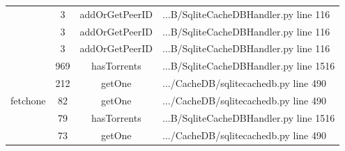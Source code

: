 \begin{table}[!h]
{\begin{tabular}{|c|c|c|l|}
		\multicolumn{1}{|c|}{} & \multicolumn{1}{c|}{3}  & \multicolumn{1}{c|}{addOrGetPeerID}  & \multicolumn{1}{l|}{...B/SqliteCacheDBHandler.py line 116}  \\ \cline{2-4} 
		\multicolumn{1}{|c|}{} & \multicolumn{1}{c|}{3}  & \multicolumn{1}{c|}{addOrGetPeerID}  & \multicolumn{1}{l|}{...B/SqliteCacheDBHandler.py line 116}  \\ \cline{2-4} 
		\multicolumn{1}{|c|}{} & \multicolumn{1}{c|}{3}  & \multicolumn{1}{c|}{addOrGetPeerID}  & \multicolumn{1}{l|}{...B/SqliteCacheDBHandler.py line 116}  \\ \hline 
		\multicolumn{1}{|c|}{\multirow{5}{*}{fetchone}} & \multicolumn{1}{c|}{969} & \multicolumn{1}{c|}{hasTorrents} & \multicolumn{1}{l|}{...B/SqliteCacheDBHandler.py line 1516} \\ \cline{2-4}
		\multicolumn{1}{|c|}{} & \multicolumn{1}{c|}{212}  & \multicolumn{1}{c|}{getOne}  & \multicolumn{1}{l|}{.../CacheDB/sqlitecachedb.py line 490}  \\ \cline{2-4} 
		\multicolumn{1}{|c|}{} & \multicolumn{1}{c|}{82}  & \multicolumn{1}{c|}{getOne}  & \multicolumn{1}{l|}{.../CacheDB/sqlitecachedb.py line 490}  \\ \cline{2-4} 
		\multicolumn{1}{|c|}{} & \multicolumn{1}{c|}{79}  & \multicolumn{1}{c|}{hasTorrents}  & \multicolumn{1}{l|}{...B/SqliteCacheDBHandler.py line 1516}  \\ \cline{2-4} 
		\multicolumn{1}{|c|}{} & \multicolumn{1}{c|}{73}  & \multicolumn{1}{c|}{getOne}  & \multicolumn{1}{l|}{.../CacheDB/sqlitecachedb.py line 490}  \\ \hline 
	\end{tabular}}
\end{table}
	
